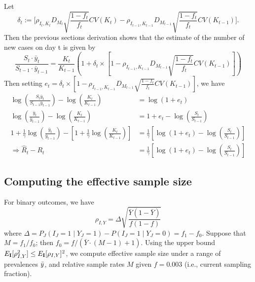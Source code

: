 \documentclass[12pt]{amsart}
\numberwithin{equation}{section}
\theoremstyle{plain}
\def\I{\bf I}
\begin{document}
Let
$$
\delta_t := \bigg[ \rho_{I_t,K_t} D_{M_t} \sqrt{\frac{1-f_t}{f_t}} CV (K_t)  -\rho_{I_{t-1},K_{t-1}} D_{M_{t-1}} \sqrt{\frac{1-f_t}{f_t}} CV (K_{t-1}) \bigg].
$$
Then the previous sections derivation shows that the estimate of the number of new cases on day t is given by
$$
\frac{S_t \cdot \bar y_t}{S_{t-1} \cdot \bar y_{t-1}} =
\frac{K_t}{K_{t-1}} \left( 1 + \delta_t \times \left[ 1 - \rho_{I_{t-1},K_{t-1}} D_{M_{t-1}} \sqrt{\frac{1-f_t}{f_t}} CV (K_{t-1}) \right] \right)
$$
Then setting $e_t = \delta_t \times [1 - \rho_{I_{t-1},K_{t-1}} D_{M_{t-1}} \sqrt{\frac{1-f_t}{f_t}} CV (K_{t-1}) ]$, we have
$$
\begin{aligned}
\log \left( \frac{S_t \bar y_t}{S_{t-1} \bar y_{t-1}} \right) - \log \left( \frac{K_t}{K_{t-1}} \right) &= \log (1 + e_t) \\
\log \left( \frac{\bar y_t}{\bar y_{t-1}} \right) - \log \left( \frac{K_t}{K_{t-1}} \right) &= 1 + e_t - \log \left( \frac{S_t}{S_{t-1}} \right) \\
1 + \frac{1}{\gamma} \log \left( \frac{\bar y_t}{\bar y_{t-1}} \right) - \left[ 1 + \frac{1}{\gamma} \log \left( \frac{K_t}{K_{t-1}} \right) \right] &= \frac{1}{\gamma} \left[ \log \left( 1 + e_t \right) - \log \left( \frac{S_{t}}{S_{t-1}} \right) \right] \\
\Rightarrow \hat R_t - R_t &= \frac{1}{\gamma} \left[ \log \left( 1 + e_t \right) - \log \left( \frac{S_{t}}{S_{t-1}} \right) \right]
\end{aligned}
$$

\subsection{Computing the effective sample size}
\label{section:effss}

For binary outcomes, we have
\begin{equation} \label{eq:binaryrho}
\rho_{I,Y} = \Delta \sqrt{\frac{\bar Y (1 - \bar Y)}{f (1-f)} }
\end{equation}
where $\Delta = P_J (I_J = 1 \mid Y_J = 1) - P(I_J = 1 \mid Y_J = 0) = f_1 - f_0$.  Suppose that $M = f_1/f_0$; then $f_0 = f / (\bar Y \cdot (M-1) + 1)$.  Using the upper bound $E_{\I} [ \rho_{I,Y}^2 ] \leq E_{\I} [\rho_{I,Y} ]^2$, we compute effective sample size under a range of prevalences $\bar{y}$, and relative sample rates $M$ given $f = 0.003$ (i.e., current sampling fraction).
\end{document}

